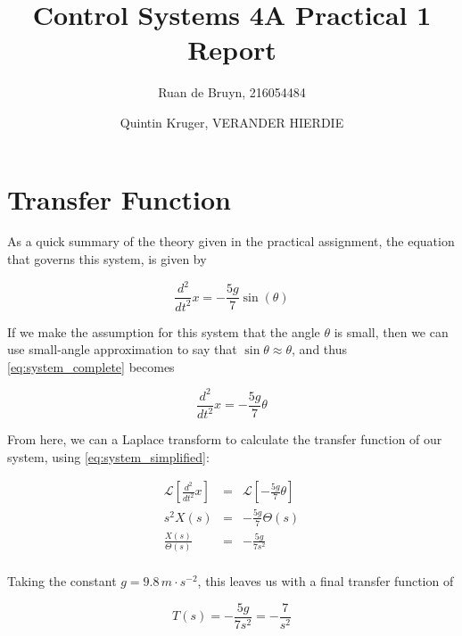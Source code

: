 \documentclass[a4paper, 12pt]{article}
\title{Control Systems 4A Practical 1 Report}
\author{Ruan de Bruyn, 216054484 \and Quintin Kruger, VERANDER HIERDIE}
\begin{document}
\begin{titlepage}
  \maketitle
\end{titlepage}

\tableofcontents
\newpage
{}

\section{Transfer Function}
	As a quick summary of the theory given in the practical assignment, the
	equation that governs this system, is given by

	\begin{equation}
	  \frac{d^2}{dt^2} x = -\frac{5g}{7} \sin(\theta)
	  \label{eq:system_complete}
	\end{equation}

	If we make the assumption for this system that the angle $\theta$ is small,
	then we can use small-angle approximation to say that $\sin \theta \approx
	\theta$, and thus \eqref{eq:system_complete} becomes

	\begin{equation}
	  \frac{d^2}{dt^2} x = -\frac{5g}{7} \theta
	  \label{eq:system_simplified}
	\end{equation}

	From here, we can a Laplace transform to calculate the transfer function of
	our system, using \eqref{eq:system_simplified}:

	\begin{equation*}
	  \begin{array}{rcl}
		\mathcal{L}\left[ \frac{d^2}{dt^2}x \right] & = & \mathcal{L}\left[ -\frac{5g}{7}\theta \right] \\
		s^2 X(s) & = & -\frac{5g}{7}\Theta(s) \\
		\frac{X(s)}{\Theta(s)}  & = & -\frac{5g}{7s^2} \\
	  \end{array}
	  \label{eq:transfer_function}
	\end{equation*}
	
	Taking the constant $g = 9.8 \, m \cdot s^{-2}$, this leaves us with a final transfer function of

	\begin{equation}
	  T(s) = -\frac{5g}{7s^2} = -\frac{7}{s^2}
	  \label{eq:tf_final}
	\end{equation}
\end{document}
